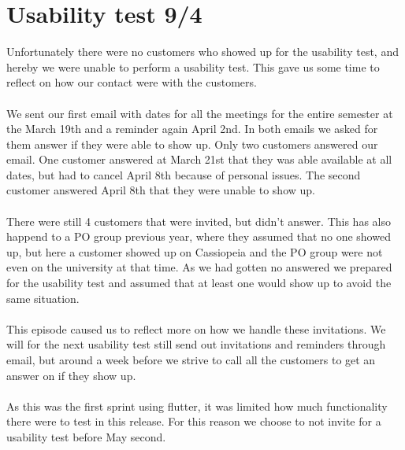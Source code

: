 \section{Usability test 9/4}
Unfortunately there were no customers who showed up for the usability test, and hereby we were unable to perform a usability test.
This gave us some time to reflect on how our contact were with the customers.
\\\\
We sent our first email with dates for all the meetings for the entire semester at the March 19th and a reminder again April 2nd.
In both emails we asked for them answer if they were able to show up. 
Only two customers answered our email. 
One customer answered at March 21st that they was able available at all dates, but had to cancel April 8th because of personal issues.
The second customer answered April 8th that they were unable to show up.
\\\\
There were still 4 customers that were invited, but didn't answer.
This has also happend to a PO group previous year, where they assumed that no one showed up, but here a customer showed up on Cassiopeia and the PO group were not even on the university at that time. 
As we had gotten no answered we prepared for the usability test and assumed that at least one would show up to avoid the same situation.
\\\\
This episode caused us to reflect more on how we handle these invitations.
We will for the next usability test still send out invitations and reminders through email, but around a week before we strive to call all the customers to get an answer on if they show up. 
\\\\
As this was the first sprint using flutter, it was limited how much functionality there were to test in this release. 
For this reason we choose to not invite for a usability test before May second.
